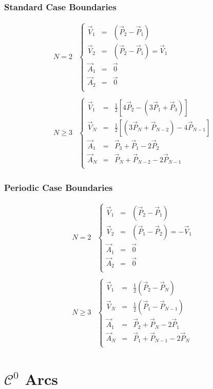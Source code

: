 \documentclass[aps,12pt]{revtex4}
\begin{document}
\subsubsection{Standard Case Boundaries}
\begin{equation}
\begin{array}{rl}
N=2 &
	\left\lbrace
	\begin{array}{rcl}
	\vec{V}_1 & = &  \left( \vec{P}_2 - \vec{P}_1\right)\\
	\vec{V}_2 & = &  \left( \vec{P}_2 - \vec{P}_1\right) = \vec{V}_1\\
	\vec{A}_1 & = & \vec{0}\\
	\vec{A}_2 & = & \vec{0}\\
	\end{array}
	\right.
	\\
	\\
	N\geq3 & 
	\left\lbrace
	\begin{array}{rcl}
	\vec{V}_1 & = & \frac{1}{2} \left[ 4\vec{P}_2     - (3\vec{P}_1+\vec{P}_3)\right]\\
	\vec{V}_N & = & \frac{1}{2} \left[ (3\vec{P}_{N}+\vec{P}_{N-2})-4\vec{P}_{N-1} \right]\\
	\vec{A}_1 & = & \vec{P}_3+\vec{P}_1-2\vec{P}_2         \\
	\vec{A}_N & = & \vec{P}_N+\vec{P}_{N-2}-2\vec{P}_{N-1} \\
	\end{array}
	\right.
\end{array}
\end{equation}

 
\subsubsection{Periodic Case Boundaries}

\begin{equation}
\begin{array}{rl}
N=2 &
	\left\lbrace
	\begin{array}{rcl}
	\vec{V}_1 & = &  \left( \vec{P}_2 - \vec{P}_1\right)\\
	\vec{V}_2 & = &  \left( \vec{P}_1 - \vec{P}_2\right) = -\vec{V}_1\\
	\vec{A}_1 & = & \vec{0}\\
	\vec{A}_2 & = & \vec{0}\\
	\end{array}
	\right.
	\\
	\\
	N\geq3 & 
	\left\lbrace
	\begin{array}{rcl}
	\vec{V}_1 & = & \frac{1}{2} \left( \vec{P}_2 - \vec{P}_N\right)\\
	\vec{V}_N & = & \frac{1}{2} \left( \vec{P}_1 - \vec{P}_{N-1}\right)\\
	\vec{A}_1 & = & \vec{P}_2+\vec{P}_{N}-2\vec{P}_1         \\
	\vec{A}_N & = & \vec{P}_1+\vec{P}_{N-1}-2\vec{P}_{N} \\
	\end{array}
	\right.
\end{array}
\end{equation}

\section{$\mathcal{C}^0$ Arcs}
\end{document}
